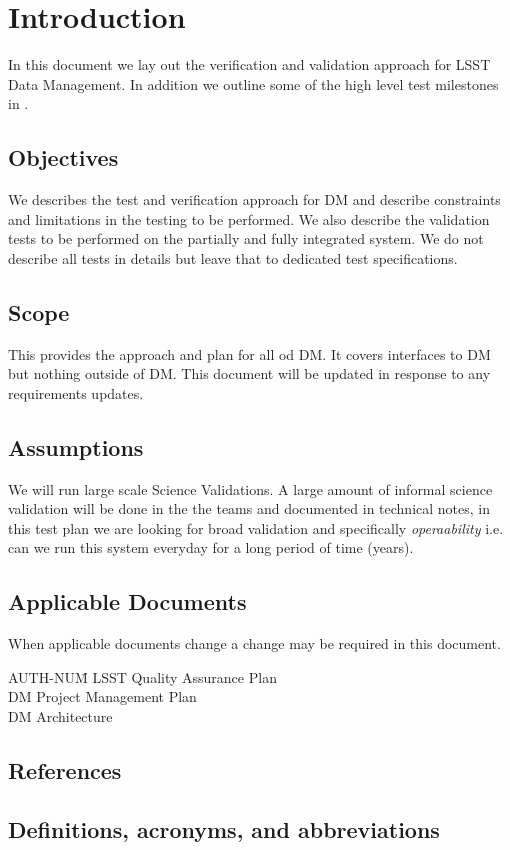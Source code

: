 
\section{Introduction \label{sect:intro}}
In this document  we lay out  the verification and validation approach for LSST Data Management. In addition we outline some of the high level test milestones in .


\subsection{Objectives \label{sect:objectives}}

We describes the test and verification approach for DM and describe  constraints and limitations in the testing to be performed. 
We also describe the validation tests to be performed on the partially and fully integrated system. 
We do not describe all tests in details but leave that to dedicated test specifications.

\subsection{Scope \label{sect:scope}}

This provides the approach and plan for all od DM. It covers interfaces to DM but nothing outside of DM. 
This document will be updated in response to any  requirements updates.

\subsection{Assumptions}  
 We will run large scale Science Validations. A large amount of informal science validation will be done in the the teams and documented in technical notes, in this test plan we are looking for broad validation and specifically {\em operaability} i.e. can we run this system everyday for a long period of time (years).

\subsection{Applicable Documents \label{sect:ad}}
When applicable documents change a change may be required in this document.
\begin{tabbing}
AUTH-NUM\= \kill 
{}\>	LSST Quality  Assurance Plan \\
 \>	DM Project Management Plan   \\
\>	DM Architecture\\
\end{tabbing}

\subsection{References}

\renewcommand{\refname}{}


\subsection{Definitions, acronyms, and abbreviations \label{sect:acronyms}} 





